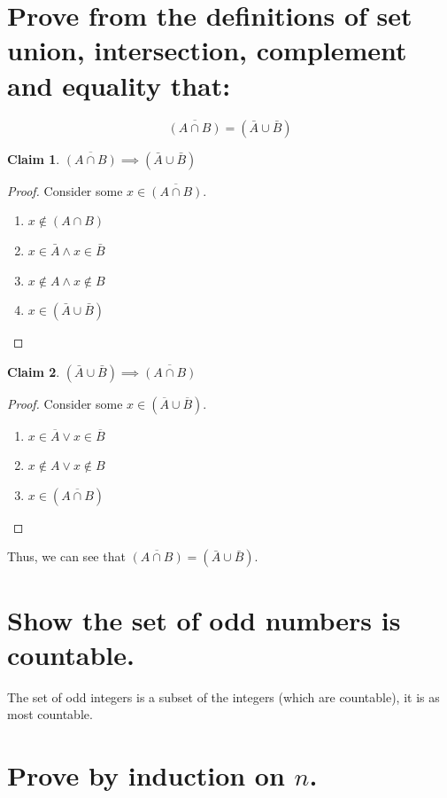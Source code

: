 \documentclass[11pt]{article}
\newtheorem*{claim*}{Claim}
\begin{document}
\section{Prove from the definitions of set union, intersection, complement and equality that:}
\begin{equation}
\overline{(A \cap B)} = (\bar{A} \cup \bar{B})
\end{equation}

\begin{claim*} $\overline{(A \cap B)} \implies (\bar{A} \cup \bar{B})$ \end{claim*}
\begin{proof}
Consider some $x \in \overline{(A \cap B)}$.
\begin{enumerate}[(1)]
\item $x \notin (A \cap B)$
\item $x \in \bar{A} \wedge x \in \bar{B}$
\item $x \notin A \wedge x \notin B$
\item $x \in (\bar{A} \cup \bar{B})$
\end{enumerate}
\end{proof}

\begin{claim*} $(\bar{A} \cup \bar{B}) \implies \overline{(A \cap B)}$ \end{claim*}
\begin{proof}
Consider some $x \in (\overline{A} \cup \overline{B})$.
\begin{enumerate}[(1)]
\item $x \in \overline{A} \lor x \in \overline{B}$
\item $x \notin A \lor x \notin B$
\item $x \in (\overline{A \cap B})$
\end{enumerate}
\end{proof}

Thus, we can see that $\overline{(A \cap B)} = (\bar{A} \cup \bar{B})$.

\section{Show the set of odd numbers is countable.}
The set of odd integers is a subset of the integers (which are countable), it is as most countable.

\section{Prove by induction on $n$.}
\end{document}
